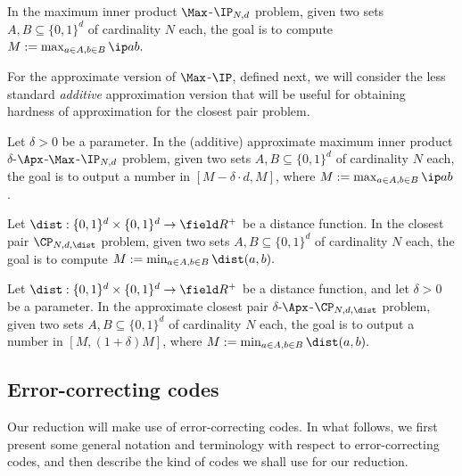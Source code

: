 \documentclass[11pt]{article}
\begin{document}
\begin{defn} In  the \textsf{maximum inner product $\Max$-$\IP_{N,d}$ problem},
given two sets $A, B\subseteq\{0,1\}^d$
of cardinality $N$ each, the goal is to compute 
$M:=\max_{a \in A, b \in B} \ip a b.$
\end{defn}

For the approximate version of $\Max$-$\IP$, defined next, we will consider the less standard \emph{additive} approximation version that will be useful for obtaining  hardness of approximation  for the closest pair problem.

\begin{defn} 
Let $\delta >0$ be a parameter.
In  the \textsf{(additive) approximate maximum inner product $\delta$-$\Apx$-$\Max$-$\IP_{N,d}$ problem},
given two sets $A, B\subseteq\{0,1\}^d$ of cardinality $N$ each, the goal is to output a number in $[M-\delta\cdot d, M]$, where $M:=\max_{a \in A, b \in B} \ip a b$.
\end{defn}

\begin{defn} 
Let $\dist:\{0,1\}^d \times\{0,1\}^d \to\field R^+$ be a distance function. In the \textsf{closest pair  $\CP_{N,d,\dist}$ problem},
given two sets $A, B\subseteq\{0,1\}^d$
of cardinality $N$ each, the goal is to compute 
$M:=\min_{a \in A, b \in B} \dist(a,b).$
\end{defn}


\begin{defn} 
Let $\dist:\{0,1\}^d \times\{0,1\}^d \to\field R^+$ be a distance function, and let $\delta>0$ be a parameter. In the \textsf{approximate closest pair  $\delta$-$\Apx$-$\CP_{N,d,\dist}$ problem},
given two sets $A, B\subseteq\{0,1\}^d$
of cardinality $N$ each, the goal is to output a number
in $[M, (1+\delta)M]$, where 
$M:=\min_{a \in A, b \in B} \dist(a,b).$
\end{defn}


\subsection{Error-correcting codes}

Our reduction will make use of error-correcting codes. In what follows, we first present some general notation and terminology with respect to error-correcting codes, and then describe the kind of codes we shall use for our reduction.
\end{document}
